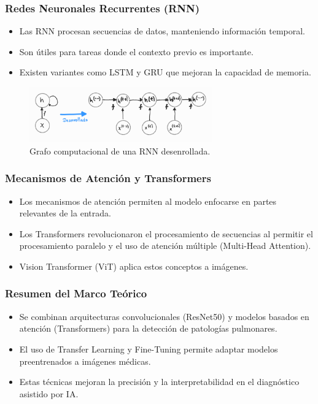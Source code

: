 \begin{frame}
\frametitle{Redes Neuronales Recurrentes (RNN)}
\begin{itemize}
    \item Las RNN procesan secuencias de datos, manteniendo información temporal.
    \item Son útiles para tareas donde el contexto previo es importante.
    \item Existen variantes como LSTM y GRU que mejoran la capacidad de memoria.
\end{itemize}
\begin{figure}[ht!]
    \centering
    \includegraphics[width=0.7\textwidth]{../Chapters/2. Transformer/Figures/rnn/rnn_cgraph.png}
    \caption{Grafo computacional de una RNN desenrollada.}
\end{figure}
\end{frame}

\begin{frame}
\frametitle{Mecanismos de Atención y Transformers}
\begin{itemize}
    \item Los mecanismos de atención permiten al modelo enfocarse en partes relevantes de la entrada.
    \item Los Transformers revolucionaron el procesamiento de secuencias al permitir el procesamiento paralelo y el uso de atención múltiple (Multi-Head Attention).
    \item Vision Transformer (ViT) aplica estos conceptos a imágenes.
\end{itemize}
\end{frame}

\begin{frame}
\frametitle{Resumen del Marco Teórico}
\begin{itemize}
    \item Se combinan arquitecturas convolucionales (ResNet50) y modelos basados en atención (Transformers) para la detección de patologías pulmonares.
    \item El uso de Transfer Learning y Fine-Tuning permite adaptar modelos preentrenados a imágenes médicas.
    \item Estas técnicas mejoran la precisión y la interpretabilidad en el diagnóstico asistido por IA.
\end{itemize}
\end{frame}
